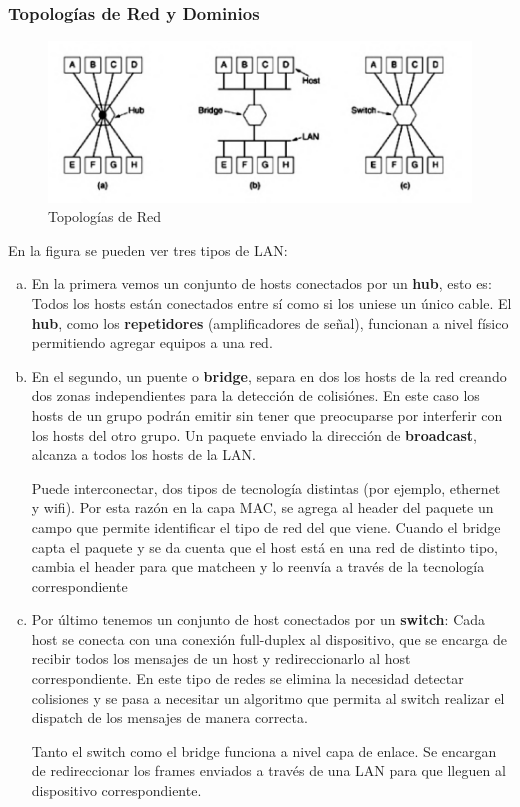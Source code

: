 \subsubsection{Topologías de Red y Dominios}
\begin{figure}[H]
	\centering
	\includegraphics[width=\textwidth
]{images/topologias-red.png}
	\caption[Topologías de Red]{Topologías de Red}
	\label{fig:topologias-red}
\end{figure}
En la figura \label{fig:topologias-red} se pueden ver tres tipos de LAN:
\begin{enumerate}[a)]
  \item En la primera vemos un conjunto de hosts conectados por un \textbf{hub}, esto es: Todos los hosts están conectados entre sí como si los uniese un único cable. El \textbf{hub}, como los \textbf{repetidores} (amplificadores de señal), funcionan a nivel físico permitiendo agregar equipos a una red.
  \item En el segundo, un puente o \textbf{bridge}, separa en dos los hosts de la red creando dos zonas independientes para la detección de colisiónes. En este caso los hosts de un grupo podrán emitir sin tener que preocuparse por interferir con los hosts del otro grupo. Un paquete enviado la dirección de \textbf{broadcast}, alcanza a todos los hosts de la LAN.
  
  Puede interconectar, dos tipos de tecnología distintas (por ejemplo, ethernet y wifi). Por esta razón en la capa MAC, se agrega al header del paquete un campo que permite identificar el tipo de red del que viene. Cuando el bridge capta el paquete y se da cuenta que el host está en una red de distinto tipo, cambia el header para que matcheen y lo reenvía a través de la tecnología correspondiente
  \item Por último tenemos un conjunto de host conectados por un \textbf{switch}: Cada host se conecta con una conexión full-duplex al dispositivo, que se encarga de recibir todos los mensajes de un host y redireccionarlo al host correspondiente. En este tipo de redes se elimina la necesidad detectar colisiones y se pasa a necesitar un algoritmo que permita al switch realizar el dispatch de los mensajes de manera correcta.
  
  Tanto el switch como el bridge funciona a nivel capa de enlace. Se encargan de redireccionar los frames enviados a través de una LAN para que lleguen al dispositivo correspondiente.
\end{enumerate}

